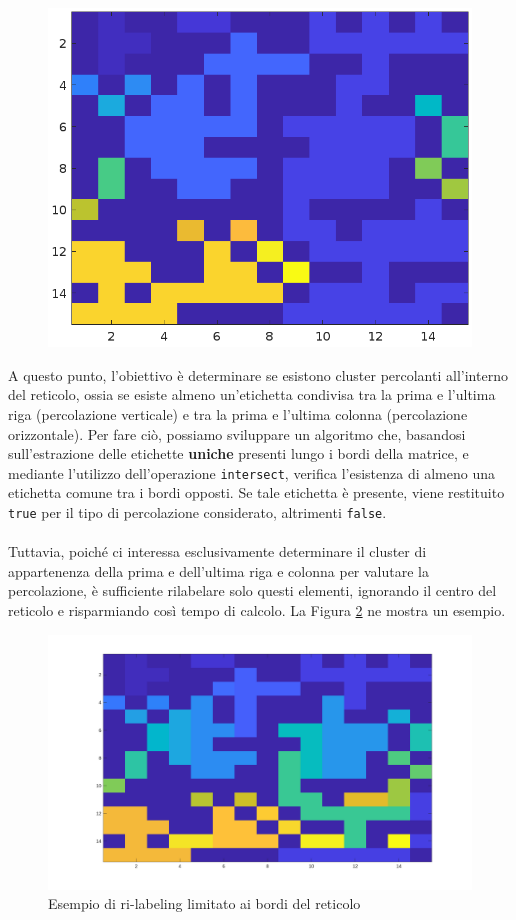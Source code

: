 \begin{figure}[H]
\begin{minipage}{0.45\textwidth}
		\includegraphics[width=\linewidth]{images/re-labelled}
		\label{fig:basegrid}
	\end{minipage}
\end{figure}
\noindent
A questo punto, l'obiettivo è determinare se esistono cluster percolanti all'interno del reticolo, ossia se esiste almeno un'etichetta condivisa tra la prima e l'ultima riga (percolazione verticale) e tra la prima e l'ultima colonna (percolazione orizzontale). Per fare ciò, possiamo sviluppare un algoritmo che, basandosi sull'estrazione delle etichette \textbf{uniche} presenti lungo i bordi della matrice, e mediante l'utilizzo dell'operazione \texttt{intersect},  verifica l'esistenza di almeno una etichetta comune tra i bordi opposti. Se tale etichetta è presente, viene restituito \texttt{true} per il tipo di percolazione considerato, altrimenti \texttt{false}.
\\\\
\noindent
Tuttavia, poiché ci interessa esclusivamente determinare il cluster di appartenenza della prima e dell’ultima riga e colonna per valutare la percolazione, è sufficiente rilabelare solo questi elementi, ignorando il centro del reticolo e risparmiando così tempo di calcolo. La Figura \ref{fig:relabelled-edge} ne mostra un esempio.
\begin{figure}
	\centering
	\includegraphics[width=0.7\linewidth]{images/re-labelled-edge}
	\caption{Esempio di ri-labeling limitato ai bordi del reticolo}
	\label{fig:relabelled-edge}
\end{figure}
